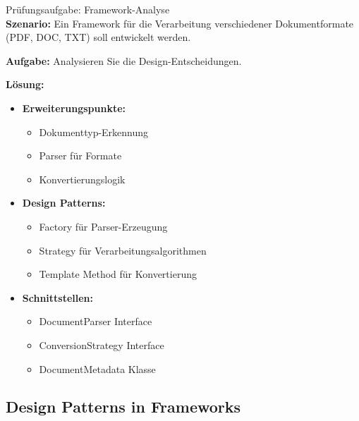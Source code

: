 \begin{example2}{Prüfungsaufgabe: Framework-Analyse}\\
\textbf{Szenario:}
Ein Framework für die Verarbeitung verschiedener Dokumentformate (PDF, DOC, TXT) 
soll entwickelt werden.

\textbf{Aufgabe:}
Analysieren Sie die Design-Entscheidungen.

\textbf{Lösung:}
\begin{itemize}
    \item \textbf{Erweiterungspunkte:}
    \begin{itemize}
        \item Dokumenttyp-Erkennung
        \item Parser für Formate
        \item Konvertierungslogik
    \end{itemize}
    
    \item \textbf{Design Patterns:}
    \begin{itemize}
        \item Factory für Parser-Erzeugung
        \item Strategy für Verarbeitungsalgorithmen
        \item Template Method für Konvertierung
    \end{itemize}
    
    \item \textbf{Schnittstellen:}
    \begin{itemize}
        \item DocumentParser Interface
        \item ConversionStrategy Interface
        \item DocumentMetadata Klasse
    \end{itemize}
\end{itemize}
\end{example2}



\subsection{Design Patterns in Frameworks}

